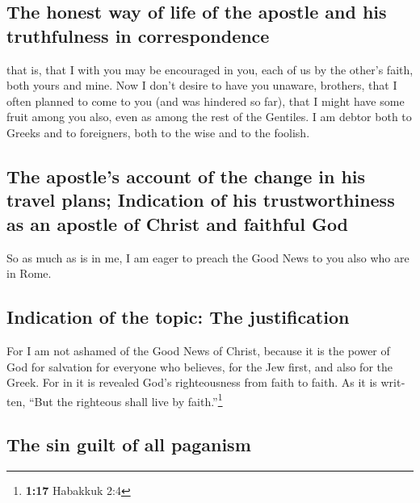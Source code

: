 \begin{paracol}{2}
\begin{otherlanguage}{english}
\hypertarget{the-honest-way-of-life-of-the-apostle-and-his-truthfulness-in-correspondence}{%
\subsection{The honest way of life of the apostle and his truthfulness
in
correspondence}\label{the-honest-way-of-life-of-the-apostle-and-his-truthfulness-in-correspondence}}

 that is, that I with you may be encouraged in you, each
of us by the other's faith, both yours and mine.  Now I
don't desire to have you unaware, brothers, that I often planned to come
to you (and was hindered so far), that I might have some fruit among you
also, even as among the rest of the Gentiles.  I am
debtor both to Greeks and to foreigners, both to the wise and to the
foolish.

\hypertarget{the-apostles-account-of-the-change-in-his-travel-plans-indication-of-his-trustworthiness-as-an-apostle-of-christ-and-faithful-god}{%
\subsection{The apostle's account of the change in his travel plans;
Indication of his trustworthiness as an apostle of Christ and faithful
God}\label{the-apostles-account-of-the-change-in-his-travel-plans-indication-of-his-trustworthiness-as-an-apostle-of-christ-and-faithful-god}}

 So as much as is in me, I am eager to preach the Good
News to you also who are in Rome.

\hypertarget{indication-of-the-topic-the-justification}{%
\subsection{Indication of the topic: The
justification}\label{indication-of-the-topic-the-justification}}

 For I am not ashamed of the Good News of Christ, because
it is the power of God for salvation for everyone who believes, for the
Jew first, and also for the Greek.  For in it is revealed
God's righteousness from faith to faith. As it is written, ``But the
righteous shall live by faith.''\footnote{\textbf{1:17} Habakkuk 2:4}

\hypertarget{the-sin-guilt-of-all-paganism}{%
\subsection{The sin guilt of all
paganism}\label{the-sin-guilt-of-all-paganism}}


\end{otherlanguage}
\end{paracol}

